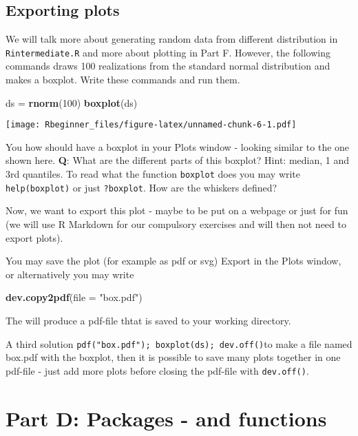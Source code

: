 \documentclass[]{article}
\newenvironment{Shaded}{\begin{snugshade}}{\end{snugshade}}
\newcommand{\KeywordTok}[1]{\textcolor[rgb]{0.13,0.29,0.53}{\textbf{#1}}}
\newcommand{\DataTypeTok}[1]{\textcolor[rgb]{0.13,0.29,0.53}{#1}}
\newcommand{\DecValTok}[1]{\textcolor[rgb]{0.00,0.00,0.81}{#1}}
\newcommand{\StringTok}[1]{\textcolor[rgb]{0.31,0.60,0.02}{#1}}
\newcommand{\NormalTok}[1]{#1}
\begin{document}
\subsection{Exporting plots}\label{exporting-plots}

We will talk more about generating random data from different
distribution in \texttt{Rintermediate.R} and more about plotting in Part
F. However, the following commands draws 100 realizations from the
standard normal distribution and makes a boxplot. Write these commands
and run them.

\begin{Shaded}
\begin{Highlighting}[]
\NormalTok{ds =}\StringTok{ }\KeywordTok{rnorm}\NormalTok{(}\DecValTok{100}\NormalTok{)}
\KeywordTok{boxplot}\NormalTok{(ds)}
\end{Highlighting}
\end{Shaded}

\texttt{[image: Rbeginner\_files/figure-latex/unnamed-chunk-6-1.pdf]}

You how should have a boxplot in your Plots window - looking similar to
the one shown here. \textbf{Q}: What are the different parts of this
boxplot? Hint: median, 1 and 3rd quantiles. To read what the function
\texttt{boxplot} does you may write \texttt{help(boxplot)} or just
\texttt{?boxplot}. How are the whiskers defined?

Now, we want to export this plot - maybe to be put on a webpage or just
for fun (we will use R Markdown for our compulsory exercises and will
then not need to export plots).

You may save the plot (for example as pdf or svg) Export in the Plots
window, or alternatively you may write

\begin{Shaded}
\begin{Highlighting}[]
\KeywordTok{dev.copy2pdf}\NormalTok{(}\DataTypeTok{file =} \StringTok{"box.pdf"}\NormalTok{)}
\end{Highlighting}
\end{Shaded}

The will produce a pdf-file thtat is saved to your working directory.

A third solution \texttt{pdf("box.pdf");\ boxplot(ds);\ dev.off()}to
make a file named box.pdf with the boxplot, then it is possible to save
many plots together in one pdf-file - just add more plots before closing
the pdf-file with \texttt{dev.off()}.

\section{Part D: Packages - and
functions}\label{part-d-packages---and-functions}
\end{document}
